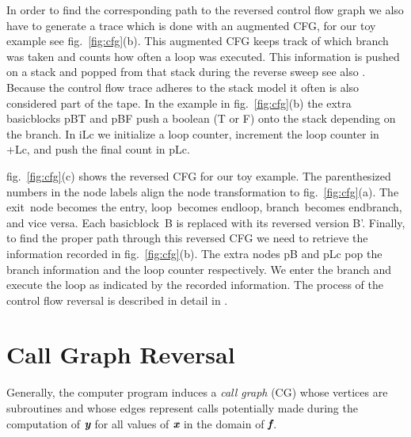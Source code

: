 \documentclass{book}
\newcommand{\entry}{entry}
\newcommand{\exit}{exit}
\newcommand{\Loop}{loop}
\newcommand{\EndLoop}{endloop}
\newcommand{\branch}{branch}
\newcommand{\EndBranch}{endbranch}
\newcommand{\basicblock}{basicblock}
\newcommand{\bmf}{\mbox{\bf\em f}}
\newcommand{\bmx}{\mbox{\bf\em x}}
\newcommand{\bmy}{\mbox{\bf\em y}}
\newcommand{\reffig}[1]{{fig.~\ref{#1}}}
\begin{document}
In order to find the corresponding path to the reversed control flow graph 
we also have to generate a trace which is done with an augmented CFG,
for our toy example see \reffig{fig:cfg}(b).
This augmented CFG  keeps track of which branch was taken and counts how 
often a loop was 
executed.  
This information is pushed on  a stack and popped from that stack during the 
reverse sweep see also \cite{Utke2006ERo}. Because the control flow trace 
adheres to the stack model it often is also considered part of the tape. 
In the example in \reffig{fig:cfg}(b) the extra {\basicblock}s pBT and pBF push 
a boolean (T or F) onto the stack depending on the branch. 
In iLc we initialize a loop counter, increment the loop counter in +Lc, 
and push the final count in pLc. 

\reffig{fig:cfg}(c) shows the reversed CFG for our toy example. 
The parenthesized numbers in the node labels align the 
node transformation to \reffig{fig:cfg}(a). 
The \exit\ node becomes 
the \entry, \Loop\ becomes \EndLoop, \branch\ becomes \EndBranch, and vice versa. 
Each \basicblock\  B is replaced with its reversed version B'.  
Finally, to find the proper path through this reversed CFG we need to retrieve 
the information recorded in  \reffig{fig:cfg}(b). The extra nodes pB and pLc 
pop the branch information and the loop counter respectively.  
We enter the branch and execute the loop as indicated by the recorded information. 
The process of the control flow reversal is described in detail in 
\cite{Utke2006ERo}. 

\section{Call Graph Reversal} \label{sec:cgReversal}

Generally, the computer program 
induces a {\em call graph} (CG) \cite{ASU86}
whose vertices are subroutines and whose edges 
represent calls potentially made during the computation of $\bmy$ for all 
values of $\bmx$ in the domain of $\bmf$.
\end{document}
